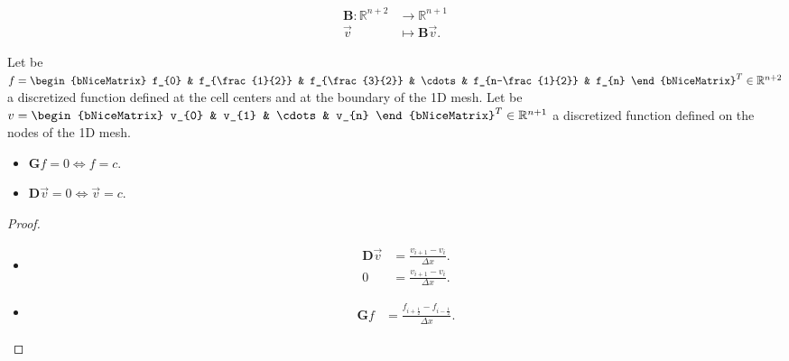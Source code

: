 \begin{align*}
	\symbf{B}\colon\mathbb{R}^{n+2} & \longrightarrow
	\mathbb{R}^{n+1}                                  \\
	\vec{v}                         & \longmapsto
	\symbf{B}\vec{v}.
\end{align*}

\begin{theorem}{}{}
	Let be
	\begin{math}
		f=
		\begin{bNiceMatrix}
			f_{0}             &
			f_{\frac{1}{2}}   &
			f_{\frac{3}{2}}   &
			\cdots            &
			f_{n-\frac{1}{2}} &
			f_{n}
		\end{bNiceMatrix}^{T}\in\mathbb{R}^{n+2}
	\end{math}
	a discretized function defined at the cell centers and
	at the boundary of the 1D mesh.
	Let be
	\begin{math}
		v=
		\begin{bNiceMatrix}
			v_{0}  &
			v_{1}  &
			\cdots &
			v_{n}
		\end{bNiceMatrix}^{T}\in\mathbb{R}^{n+1}
	\end{math}
	a discretized function defined on the nodes of the 1D mesh.

	\begin{itemize}
		\item

		      \begin{math}
			      \symbf{G}f=
			      0\iff f=
			      c
		      \end{math}.

		\item

		      \begin{math}
			      \symbf{D}\vec{v}=
			      0\iff\vec{v}=
			      c
		      \end{math}.
	\end{itemize}
\end{theorem}

\begin{proof}\leavevmode
	\begin{itemize}
		\item

		      \begin{align*}
			      \symbf{D}\vec{v} & =
			      \frac{v_{i+1}-v_{i}}{\Delta x}. \\
			      0                & =
			      \frac{v_{i+1}-v_{i}}{\Delta x}.
		      \end{align*}

		\item

		      \begin{align*}
			      \symbf{G}f & =
			      \frac{f_{i+\frac{1}{2}}-f_{i-\frac{1}{2}}}{\Delta x}.
		      \end{align*}
	\end{itemize}
\end{proof}

